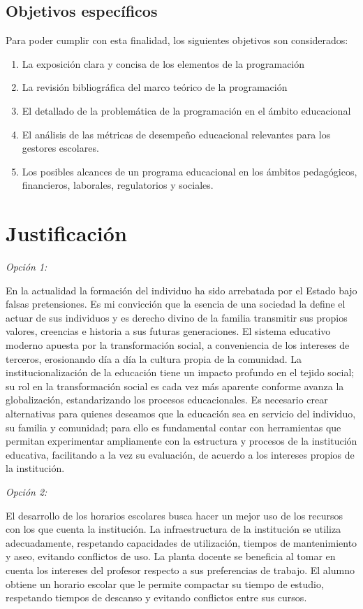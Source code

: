 \documentclass[spanish,draft,12pt,headsepline,footsepline,paper=letter]{scrreprt}
\begin{document}
\subsection*{Objetivos específicos}
Para poder cumplir con esta finalidad, los siguientes objetivos son considerados: \begin{enumerate}[1]
\setlength{\itemsep}{0cm}%
\setlength{\parskip}{0cm}%
\item La exposición clara y concisa de los elementos de la programación
\item La revisión bibliográfica del marco teórico de la programación
\item El detallado de la problemática de la programación en el ámbito educacional
\item El análisis de las métricas de desempeño educacional relevantes para los gestores escolares.
\item Los posibles alcances de un programa educacional en los ámbitos pedagógicos, financieros, laborales, regulatorios y sociales.
\end{enumerate}

\section*{Justificación}

\textit{Opción 1:}

En la actualidad la formación del individuo ha sido arrebatada por el Estado bajo falsas pretensiones. Es mi convicción que la esencia de una sociedad la define el actuar de sus individuos y es derecho divino de la familia transmitir sus propios valores, creencias e historia a sus futuras generaciones. El sistema educativo moderno apuesta por la transformación social, a conveniencia de los intereses de terceros, erosionando día a día la cultura propia de la comunidad. La institucionalización de la educación tiene un impacto profundo en el tejido social; su rol en la transformación social es cada vez más aparente conforme avanza la globalización, estandarizando los procesos educacionales. Es necesario crear alternativas para quienes deseamos que la educación sea en servicio del individuo, su familia y comunidad; para ello es fundamental contar con herramientas que permitan experimentar ampliamente con la estructura y procesos de la institución educativa, facilitando a la vez su evaluación, de acuerdo a los intereses propios de la institución. 

\textit{Opción 2:}

El desarrollo de los horarios escolares busca hacer un mejor uso de los recursos con los que cuenta la institución. La infraestructura de la institución se utiliza adecuadamente, respetando capacidades de utilización, tiempos de mantenimiento y aseo, evitando conflictos de uso. La planta docente se beneficia al tomar en cuenta los intereses del profesor respecto a sus preferencias de trabajo. El alumno obtiene un horario escolar que le permite compactar su tiempo de estudio, respetando tiempos de descanso y evitando conflictos entre sus cursos.
\end{document}
